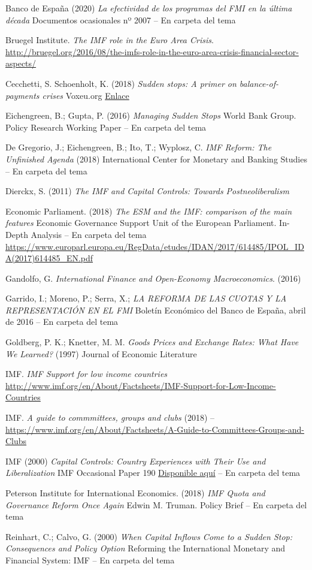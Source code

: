 \documentclass{nuevotema}
\begin{document}
Banco de España (2020) \textit{La efectividad de los programas del FMI en la última década} Documentos ocasionales nº 2007 -- En carpeta del tema

Bruegel Institute. \textit{The IMF role in the Euro Area Crisis}.  \url{ http://bruegel.org/2016/08/the-imfs-role-in-the-euro-area-crisis-financial-sector-aspects/}

Cecchetti, S. Schoenholt, K. (2018) \textit{Sudden stops: A primer on balance-of-payments crises} Voxeu.org \href{https://voxeu.org/content/sudden-stops-primer-balance-payments-crises}{Enlace}

Eichengreen, B.; Gupta, P. (2016) \textit{Managing Sudden Stops} World Bank Group. Policy Research Working Paper -- En carpeta del tema

De Gregorio, J.; Eichengreen, B.; Ito, T.; Wyplosz, C. \textit{IMF Reform: The Unfinished Agenda} (2018) International Center for Monetary and Banking Studies -- En carpeta del tema

Dierckx, S. (2011) \textit{The IMF and Capital Controls: Towards Postneoliberalism} 

Economic Parliament. (2018) \textit{The ESM and the IMF: comparison of the main features} Economic Governance Support Unit of the European Parliament. In-Depth Analysis -- En carpeta del tema \url{https://www.europarl.europa.eu/RegData/etudes/IDAN/2017/614485/IPOL_IDA(2017)614485_EN.pdf}

Gandolfo, G. \textit{International Finance and Open-Economy Macroeconomics}. (2016)

Garrido, I.; Moreno, P.; Serra, X.; \textit{LA REFORMA DE LAS CUOTAS Y LA REPRESENTACIÓN EN EL FMI} Boletín Económico del Banco de España, abril de 2016 -- En carpeta del tema

Goldberg, P. K.; Knetter, M. M. \textit{Goods Prices and Exchange Rates: What Have We Learned?} (1997) Journal of Economic Literature

IMF. \textit{IMF Support for low income countries} \url{http://www.imf.org/en/About/Factsheets/IMF-Support-for-Low-Income-Countries}

IMF. \textit{A guide to commmittees, groups and clubs} (2018) -- \url{https://www.imf.org/en/About/Factsheets/A-Guide-to-Committees-Groups-and-Clubs}

IMF (2000) \textit{Capital Controls: Country Experiences with Their Use and Liberalization} IMF Occasional Paper 190 \href{https://www.imf.org/external/pubs/ft/op/op190/index.htm}{Disponible aquí} -- En carpeta del tema

Peterson Institute for International Economics. (2018) \textit{IMF Quota and Governance Reform Once Again} Edwin M. Truman. Policy Brief -- En carpeta del tema

Reinhart, C.; Calvo, G. (2000) \textit{When Capital Inflows Come to a Sudden Stop: Consequences and Policy Option} Reforming the International Monetary and Financial System: IMF -- En carpeta del tema 
\end{document}

